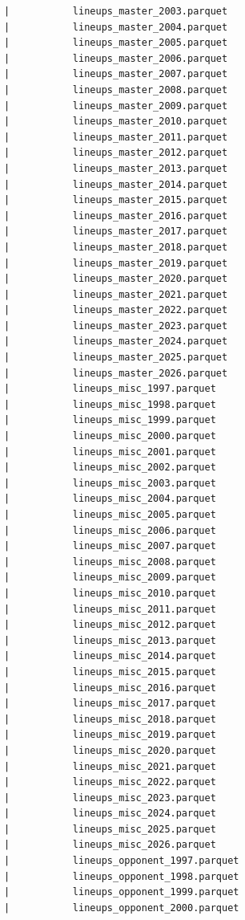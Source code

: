 \begin{lstlisting}
      |           lineups_master_2003.parquet
      |           lineups_master_2004.parquet
      |           lineups_master_2005.parquet
      |           lineups_master_2006.parquet
      |           lineups_master_2007.parquet
      |           lineups_master_2008.parquet
      |           lineups_master_2009.parquet
      |           lineups_master_2010.parquet
      |           lineups_master_2011.parquet
      |           lineups_master_2012.parquet
      |           lineups_master_2013.parquet
      |           lineups_master_2014.parquet
      |           lineups_master_2015.parquet
      |           lineups_master_2016.parquet
      |           lineups_master_2017.parquet
      |           lineups_master_2018.parquet
      |           lineups_master_2019.parquet
      |           lineups_master_2020.parquet
      |           lineups_master_2021.parquet
      |           lineups_master_2022.parquet
      |           lineups_master_2023.parquet
      |           lineups_master_2024.parquet
      |           lineups_master_2025.parquet
      |           lineups_master_2026.parquet
      |           lineups_misc_1997.parquet
      |           lineups_misc_1998.parquet
      |           lineups_misc_1999.parquet
      |           lineups_misc_2000.parquet
      |           lineups_misc_2001.parquet
      |           lineups_misc_2002.parquet
      |           lineups_misc_2003.parquet
      |           lineups_misc_2004.parquet
      |           lineups_misc_2005.parquet
      |           lineups_misc_2006.parquet
      |           lineups_misc_2007.parquet
      |           lineups_misc_2008.parquet
      |           lineups_misc_2009.parquet
      |           lineups_misc_2010.parquet
      |           lineups_misc_2011.parquet
      |           lineups_misc_2012.parquet
      |           lineups_misc_2013.parquet
      |           lineups_misc_2014.parquet
      |           lineups_misc_2015.parquet
      |           lineups_misc_2016.parquet
      |           lineups_misc_2017.parquet
      |           lineups_misc_2018.parquet
      |           lineups_misc_2019.parquet
      |           lineups_misc_2020.parquet
      |           lineups_misc_2021.parquet
      |           lineups_misc_2022.parquet
      |           lineups_misc_2023.parquet
      |           lineups_misc_2024.parquet
      |           lineups_misc_2025.parquet
      |           lineups_misc_2026.parquet
      |           lineups_opponent_1997.parquet
      |           lineups_opponent_1998.parquet
      |           lineups_opponent_1999.parquet
      |           lineups_opponent_2000.parquet

\end{lstlisting}
